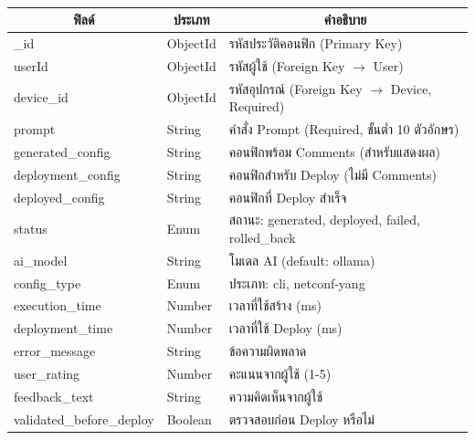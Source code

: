 
\begin{table}[H]
    \caption{}
    \label{tab:config-history-structure}
    \fontSixTeen 
    \begin{tabularx}{\textwidth}{|l|l|X|} 
        \hline
        \multicolumn{1}{|c|}{\textbf{ฟิลด์}} & \multicolumn{1}{c|}{\textbf{ประเภท}} & \multicolumn{1}{c|}{\textbf{คำอธิบาย}} \\
        \hline
        \_id & ObjectId & รหัสประวัติคอนฟิก (Primary Key) \\
        \hline
        userId & ObjectId & รหัสผู้ใช้ (Foreign Key $\rightarrow$ User) \\
        \hline
        device\_id & ObjectId & รหัสอุปกรณ์ (Foreign Key $\rightarrow$ Device, Required) \\
        \hline
        prompt & String & คำสั่ง Prompt (Required, ขั้นต่ำ 10 ตัวอักษร) \\
        \hline
        generated\_config & String & คอนฟิกพร้อม Comments (สำหรับแสดงผล) \\
        \hline
        deployment\_config & String & คอนฟิกสำหรับ Deploy (ไม่มี Comments) \\
        \hline
        deployed\_config & String & คอนฟิกที่ Deploy สำเร็จ \\
        \hline
        status & Enum & สถานะ: generated, deployed, failed, rolled\_back \\
        \hline
        ai\_model & String & โมเดล AI (default: ollama) \\
        \hline
        config\_type & Enum & ประเภท: cli, netconf-yang \\
        \hline
        execution\_time & Number & เวลาที่ใช้สร้าง (ms) \\
        \hline
        deployment\_time & Number & เวลาที่ใช้ Deploy (ms) \\
        \hline
        error\_message & String & ข้อความผิดพลาด \\
        \hline
        user\_rating & Number & คะแนนจากผู้ใช้ (1-5) \\
        \hline
        feedback\_text & String & ความคิดเห็นจากผู้ใช้ \\
        \hline
        validated\_before\_deploy & Boolean & ตรวจสอบก่อน Deploy หรือไม่ \\
        \hline

\end{tabularx}
\end{table}
